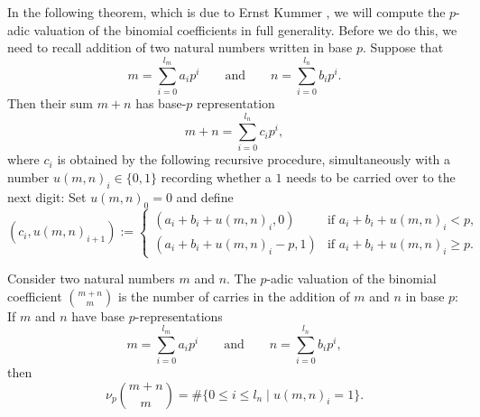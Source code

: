 In the following theorem, which is due to Ernst Kummer \cite{kummer1852}, we will compute the $p$-adic valuation of the binomial coefficients in full generality. Before we do this, we need to recall addition of two natural numbers written in base $p$. Suppose that
\begin{equation*}
  m=\sum_{i=0}^{l_m}a_ip^i\qquad\text{and}\qquad n=\sum_{i=0}^{l_{n}}b_ip^i.
\end{equation*}
Then their sum $m+n$ has base-$p$ representation
\begin{equation*}
  m+n=\sum_{i=0}^{l_n}c_ip^i,
\end{equation*}
where $c_i$ is obtained by the following recursive procedure, simultaneously with a number $u(m,n)_i\in\{0,1\}$ recording whether a $1$ needs to be carried over to the next digit: Set $u(m,n)_0=0$ and define
\begin{equation*}
  (c_i,u(m,n)_{i+1}) :=
  \begin{cases}
    (a_i+b_i+u(m,n)_i,0) & \text{if }a_i+b_i+u(m,n)_i< p, \\
    (a_i+b_i+u(m,n)_i-p,1) & \text{if }a_i+b_i+u(m,n)_i\geq p.
  \end{cases}
\end{equation*}

\begin{theorem}\label{theorem:kummers-theorem}
  Consider two natural numbers $m$ and $n$. The $p$-adic valuation of the binomial coefficient $\binom{m+n}{m}$ is the number of carries in the addition of $m$ and $n$ in base $p$: If $m$ and $n$ have base $p$-representations
  \begin{equation*}
    m = \sum_{i=0}^{l_m}a_ip^i\qquad\text{and}\qquad n = \sum_{i=0}^{l_n}b_ip^i,
  \end{equation*}
  then
  \begin{equation*}
    \nu_p\binom{m+n}{m} = \#\{0\leq i \leq l_n \mid u(m,n)_i=1\}.
  \end{equation*}
\end{theorem}

